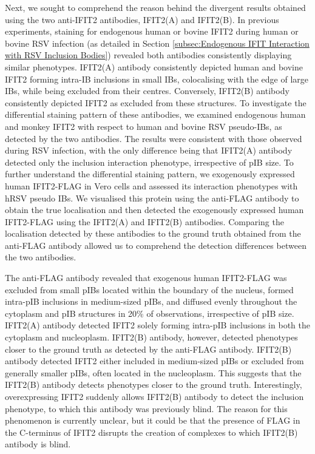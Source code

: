 Next, we sought to comprehend the reason behind the divergent results obtained using the two anti-IFIT2 antibodies, IFIT2(A) and IFIT2(B). In previous experiments, staining for endogenous human or bovine IFIT2 during human or bovine RSV infection (as detailed in Section \ref{subsec:Endogenous IFIT Interaction with RSV Inclusion Bodies}) revealed both antibodies consistently displaying similar phenotypes. IFIT2(A) antibody consistently depicted human and bovine IFIT2 forming intra-IB inclusions in small IBs, colocalising with the edge of large IBs, while being excluded from their centres. Conversely, IFIT2(B) antibody consistently depicted IFIT2 as excluded from these structures. To investigate the differential staining pattern of these antibodies, we examined endogenous human and monkey IFIT2 with respect to human and bovine RSV pseudo-IBs, as detected by the two antibodies. The results were consistent with those observed during RSV infection, with the only difference being that IFIT2(A) antibody detected only the inclusion interaction phenotype, irrespective of pIB size. To further understand the differential staining pattern, we exogenously expressed human IFIT2-FLAG in Vero cells and assessed its interaction phenotypes with hRSV pseudo IBs. We visualised this protein using the anti-FLAG antibody to obtain the true localisation and then detected the exogenously expressed human IFIT2-FLAG using the IFIT2(A) and IFIT2(B) antibodies. Comparing the localisation detected by these antibodies to the ground truth obtained from the anti-FLAG antibody allowed us to comprehend the detection differences between the two antibodies.

The anti-FLAG antibody revealed that exogenous human IFIT2-FLAG was excluded from small pIBs located within the boundary of the nucleus, formed intra-pIB inclusions in medium-sized pIBs, and diffused evenly throughout the cytoplasm and pIB structures in 20\% of observations, irrespective of pIB size. IFIT2(A) antibody detected IFIT2 solely forming intra-pIB inclusions in both the cytoplasm and nucleoplasm. IFIT2(B) antibody, however, detected phenotypes closer to the ground truth as detected by the anti-FLAG antibody. IFIT2(B) antibody detected IFIT2 either included in medium-sized pIBs or excluded from generally smaller pIBs, often located in the nucleoplasm. This suggests that the IFIT2(B) antibody detects phenotypes closer to the ground truth. Interestingly, overexpressing IFIT2 suddenly allows IFIT2(B) antibody to detect the inclusion phenotype, to which this antibody was previously blind. The reason for this phenomenon is currently unclear, but it could be that the presence of FLAG in the C-terminus of IFIT2 disrupts the creation of complexes to which IFIT2(B) antibody is blind.

